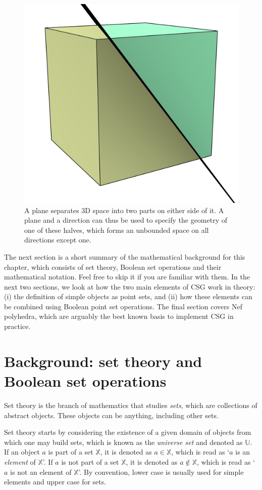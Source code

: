 \begin{figure}
\centering
\includegraphics[width=0.3\linewidth]{figs/halfspaces}
\caption{A plane separates 3D space into two parts on either side of it. A plane and a direction can thus be used to specify the geometry of one of these halves, which forms an unbounded space on all directions except one.}%
\label{fig:halfspaces3d}
\end{figure}

The next section is a short summary of the mathematical background for this chapter, which consists of set theory, Boolean set operations and their mathematical notation.
Feel free to skip it if you are familiar with them.
In the next two sections, we look at how the two main elements of CSG work in theory: (i) the definition of simple objects as point sets, and (ii) how these elements can be combined using Boolean point set operations.
The final section covers Nef polyhedra, which are arguably the best known basis to implement CSG in practice.

\section{Background: set theory and Boolean set operations}

Set theory is the branch of mathematics that studies \emph{sets}, which are collections of abstract objects.
These objects can be anything, including other sets.

Set theory starts by considering the existence of a given domain of objects from which one may build sets, which is known as the \emph{universe set} and denoted as \(\mathbb{U}\).
If an object \(a\) is part of a set \(\mathbb{X}\), it is denoted as \(a \in \mathbb{X}\), which is read as `\(a\) is an \emph{element} of \(\mathbb{X}\)'.
If \(a\) is not part of a set \(\mathbb{X}\), it is denoted as \(a \notin \mathbb{X}\), which is read as `\(a\) is not an element of \(\mathbb{X}\)'.
By convention, lower case is usually used for simple elements and upper case for sets.


